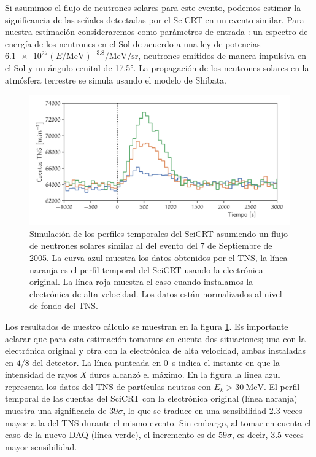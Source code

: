 Si asumimos el flujo de neutrones solares para este evento, podemos estimar la significancia de las señales detectadas por el SciCRT en un evento similar. Para nuestra estimación consideraremos como parámetros de entrada \cite{ynagai14}: un espectro de energía de los neutrones en el Sol de acuerdo a una ley de potencias
$\num{6.1e27}\left(E/\si{\mega\electronvolt}\right)^{-3.8}\si{\per\mega\electronvolt\per\steradian}$, neutrones emitidos de manera impulsiva en el Sol y un ángulo cenital de \ang{17.5}. La propagación de los neutrones solares en la atmósfera terrestre se simula usando el modelo de Shibata.

\begin{figure}
\centering
  \includegraphics[width=\textwidth]{scicrt-sim.pdf}
  \caption{Simulación de los perfiles temporales del SciCRT asumiendo un flujo de neutrones solares similar al del evento del \num{7} de Septiembre de \num{2005}. La curva azul muestra los datos obtenidos por el TNS, la línea naranja es el perfil temporal del SciCRT usando la electrónica original. La línea roja muestra el caso cuando instalamos la electrónica de alta velocidad. Los datos están normalizados al nivel de fondo del TNS.}
  \label{fig:solar-sim}
\end{figure}

Los resultados de nuestro cálculo se muestran en la figura \ref{fig:solar-sim}. Es importante aclarar que para esta estimación tomamos en cuenta dos situaciones; una con la electrónica original y otra con la electrónica de alta velocidad, ambas instaladas en $4/8$ del detector. La línea punteada en \SI{0}{\second} indica el instante en que la intensidad de rayos \emph{X} duros alcanzó el máximo. En la figura la linea azul representa los datos del TNS de partículas neutras con $E_{k}>\SI{30}{\mega\electronvolt}$. El perfil temporal de las cuentas del SciCRT con la electrónica original (línea naranja) muestra una significacia de $39\sigma$, lo que se traduce en una sensibilidad \num{2.3} veces mayor a la del TNS durante el mismo evento. Sin embargo, al tomar en cuenta el caso de la nuevo DAQ (línea verde), el incremento es de $59\sigma$, es decir, \num{3.5} veces mayor sensibilidad.

